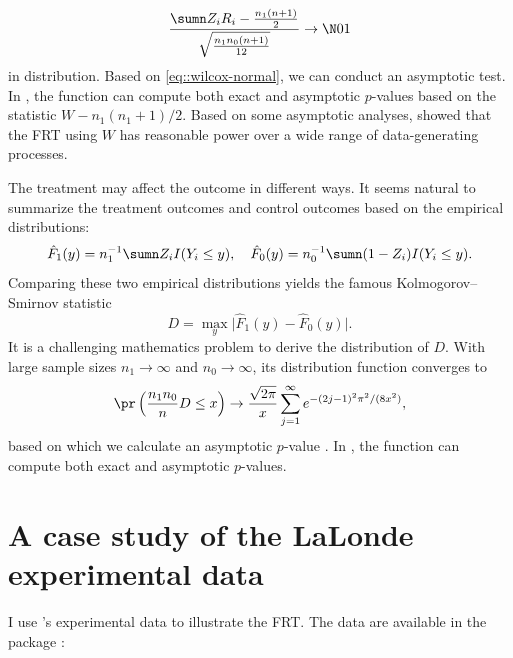 \begin{example}
\begin{eqnarray}
\label{eq::wilcox-normal}
\frac{  \sumn Z_i R_i - \frac{n_1(n+1)}{2}   }{  \sqrt{  \frac{n_1 n_0 (n+1)}{12}   }}   \rightarrow \N01 
\end{eqnarray}
in distribution. 
Based on \eqref{eq::wilcox-normal}, we can conduct an asymptotic test. In , the function  can compute both exact and asymptotic $p$-values based on the statistic $W - n_1(n_1+1)/2$. Based on some asymptotic analyses, \citet{lehmann2006nonparametrics} showed that the FRT using $W$ has reasonable power over a wide range of data-generating processes.
\end{example}





\begin{example}
\label{eg::ks-CRE}
The treatment may affect the outcome in different ways. It seems natural to summarize the treatment outcomes and control outcomes based on the empirical distributions:
$$
\hat{F}_1( y) = n_1^{-1} \sumn Z_i I(Y_i \leq y),\quad
\hat{F}_0( y ) = n_0^{-1} \sumn (1-Z_i) I(Y_i \leq y) . 
$$ 
Comparing these two empirical distributions yields the famous Kolmogorov--Smirnov statistic
$$
D = \max_y  \Big |
\hat{F}_1( y) 
- \hat{F}_0( y ) 
\Big |.
$$
It is a challenging mathematics problem to derive the distribution of $D$. With large sample sizes $n_1\rightarrow \infty$ and $n_0\rightarrow \infty$, its distribution function converges to
$$
\pr\left(  \frac{n_1 n_0}{n}  D \leq  x   \right  ) \rightarrow   \frac{\sqrt{2\pi}}{x}   \sum_{j=1}^\infty  e^{     - (2j-1)^2 \pi^2 / (8x^2) }     ,
$$
based on which we calculate an asymptotic $p$-value \citep{van2000asymptotic}. In , the function  can compute both exact and asymptotic $p$-values.
\end{example}







\section{A case study of the LaLonde experimental data}
\label{sec::frt-lalonde-experiment}

I use \citet{lalonde1986evaluating}'s experimental data to illustrate the FRT. The data are available in the  package \citep{sekhon2011multivariate}: 

